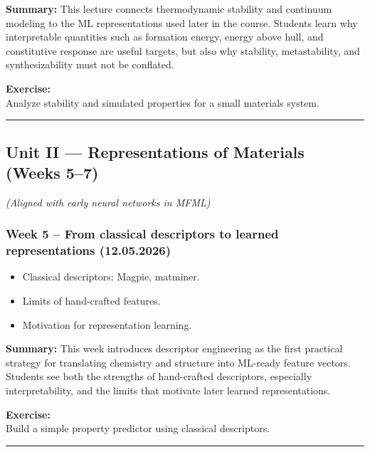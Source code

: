 \documentclass[
]{agujournal2019}
\providecommand{\tightlist}{%
  \setlength{\itemsep}{0pt}\setlength{\parskip}{0pt}}
\begin{document}
\textbf{Summary:} This lecture connects thermodynamic stability and
continuum modeling to the ML representations used later in the course.
Students learn why interpretable quantities such as formation energy,
energy above hull, and constitutive response are useful targets, but
also why stability, metastability, and synthesizability must not be
conflated.

\textbf{Exercise:}\\
Analyze stability and simulated properties for a small materials system.

\begin{center}\rule{0.5\linewidth}{0.5pt}\end{center}

\subsection{Unit II --- Representations of Materials (Weeks
5--7)}\label{unit-ii-representations-of-materials-weeks-57}

\emph{(Aligned with early neural networks in MFML)}

\subsubsection{Week 5 -- From classical descriptors to learned
representations
(12.05.2026)}\label{week-5-from-classical-descriptors-to-learned-representations-12.05.2026}

\begin{itemize}
\tightlist
\item
  Classical descriptors: Magpie, matminer.
\item
  Limits of hand-crafted features.
\item
  Motivation for representation learning.
\end{itemize}

\textbf{Summary:} This week introduces descriptor engineering as the
first practical strategy for translating chemistry and structure into
ML-ready feature vectors. Students see both the strengths of
hand-crafted descriptors, especially interpretability, and the limits
that motivate later learned representations.

\textbf{Exercise:}\\
Build a simple property predictor using classical descriptors.

\begin{center}\rule{0.5\linewidth}{0.5pt}\end{center}
\end{document}
